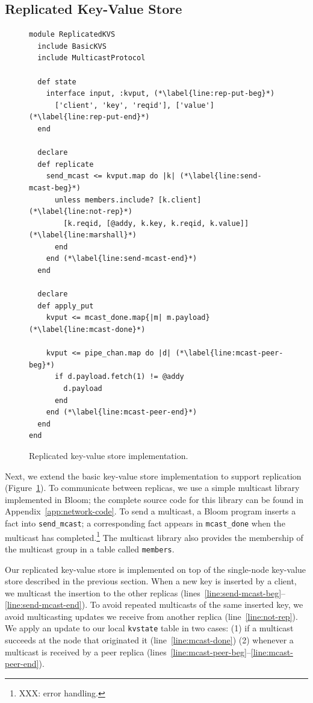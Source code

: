 \subsection{Replicated Key-Value Store}
\label{sec:rep-kvs}

\begin{figure}[t]
\begin{scriptsize}
\begin{lstlisting}
module ReplicatedKVS
  include BasicKVS
  include MulticastProtocol

  def state
    interface input, :kvput, (*\label{line:rep-put-beg}*)
      ['client', 'key', 'reqid'], ['value']  (*\label{line:rep-put-end}*)
  end

  declare
  def replicate
    send_mcast <= kvput.map do |k| (*\label{line:send-mcast-beg}*)
      unless members.include? [k.client]  (*\label{line:not-rep}*)
        [k.reqid, [@addy, k.key, k.reqid, k.value]]   (*\label{line:marshall}*)            
      end
    end (*\label{line:send-mcast-end}*)
  end

  declare
  def apply_put
    kvput <= mcast_done.map{|m| m.payload}  (*\label{line:mcast-done}*)

    kvput <= pipe_chan.map do |d| (*\label{line:mcast-peer-beg}*)
      if d.payload.fetch(1) != @addy
        d.payload
      end
    end (*\label{line:mcast-peer-end}*)
  end
end
\end{lstlisting}
\vspace{-10pt}
\caption{Replicated key-value store implementation.}
\label{fig:kvs-repl}
\end{scriptsize}
\vspace{-2pt}
\end{figure}

Next, we extend the basic key-value store implementation to support replication
(Figure~\ref{fig:kvs-repl}). To communicate between replicas, we use a simple
multicast library implemented in Bloom; the complete source code for this
library can be found in Appendix~\ref{app:network-code}. To send a multicast, a
Bloom program inserts a fact into \texttt{send\_mcast}; a corresponding fact
appears in \texttt{mcast\_done} when the multicast has completed.\footnote{XXX:
  error handling.} The multicast library also provides the membership of the
multicast group in a table called \texttt{members}.

Our replicated key-value store is implemented on top of the single-node
key-value store described in the previous section. When a new key is inserted by
a client, we multicast the insertion to the other replicas
(lines~\ref{line:send-mcast-beg}--\ref{line:send-mcast-end}). To avoid repeated
multicasts of the same inserted key, we avoid multicasting updates we receive
from another replica (line~\ref{line:not-rep}). We apply an update to our local
\texttt{kvstate} table in two cases: (1) if a multicast succeeds at the node
that originated it (line~\ref{line:mcast-done}) (2) whenever a multicast is
received by a peer replica
(lines~\ref{line:mcast-peer-beg}--\ref{line:mcast-peer-end}).

